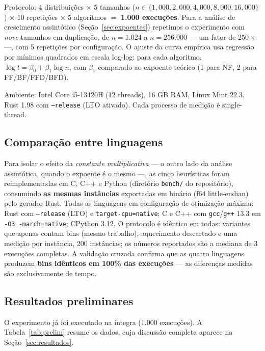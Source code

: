 \documentclass[12pt]{article}
\begin{document}
Protocolo: 4 distribuições $\times$ 5 tamanhos ($n \in \{1{,}000, 2{,}000, 4{,}000, 8{,}000, 16{,}000\}$) $\times$ 10 repetições $\times$ 5 algoritmos $=$ \textbf{1.000 execuções}. Para a análise de crescimento assintótico (Seção~\ref{sec:expoentes}) repetimos o experimento com \emph{nove} tamanhos em duplicação, de $n = 1.024$ a $n = 256.000$ --- um fator de $250\times$ ---, com 5 repetições por configuração. O ajuste da curva empírica usa regressão por mínimos quadrados em escala log-log: para cada algoritmo, $\log t = \beta_0 + \beta_1 \log n$, com $\beta_1$ comparado ao expoente teórico (1 para NF, 2 para FF/BF/FFD/BFD).

Ambiente: Intel Core i5-13420H (12 threads), 16 GB RAM, Linux Mint 22.3, Rust 1.98 com \texttt{--release} (LTO ativado). Cada processo de medição é single-thread.

\subsection{Comparação entre linguagens}

Para isolar o efeito da \textit{constante multiplicativa} --- o outro lado
da análise assintótica, quando o expoente é o mesmo ---, as cinco
heurísticas foram reimplementadas em C, C++ e Python (diretório
\texttt{bench/} do repositório), consumindo \textbf{as mesmas instâncias}
exportadas em binário (f64 little-endian) pelo gerador Rust. Todas as
linguagens em configuração de otimização máxima: Rust com
\texttt{--release} (LTO) e \texttt{target-cpu=native}; C e C++ com
\texttt{gcc}/\texttt{g++} 13.3 em \texttt{-O3 -march=native}; CPython 3.12. O protocolo é idêntico em todas: variantes que apenas contam bins
(mesmo trabalho), aquecimento descartado e uma medição por instância, 200
instâncias; os números reportados são a mediana de 3 execuções completas.
A validação cruzada confirma que as quatro linguagens produzem
\textbf{bins idênticos em 100\% das execuções} --- as diferenças medidas
são exclusivamente de tempo.

\subsection{Resultados preliminares} \label{sec:prelim}

O experimento já foi executado na íntegra (1.000 execuções). A Tabela~\ref{tab:prelim} resume os dados, cuja discussão completa aparece na Seção~\ref{sec:resultados}.
\end{document}
